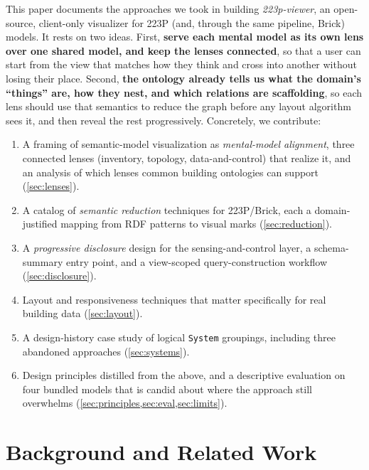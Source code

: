\documentclass[10pt,twocolumn]{article}
\newcommand{\pred}[1]{\texttt{#1}}   %
\begin{document}
This paper documents the approaches we took in building \emph{223p-viewer}, an
open-source, client-only visualizer for 223P (and, through the same pipeline,
Brick) models. It rests on two ideas. First, \textbf{serve each mental model as
its own lens over one shared model, and keep the lenses connected}, so that a user
can start from the view that matches how they think and cross into another
without losing their place. Second, \textbf{the ontology already tells us what the
domain's ``things'' are, how they nest, and which relations are scaffolding}, so
each lens should use that semantics to reduce the graph before any layout
algorithm sees it, and then reveal the rest progressively.
Concretely, we contribute:

\begin{enumerate}[leftmargin=*,itemsep=1pt]
  \item A framing of semantic-model visualization as \emph{mental-model
  alignment}, three connected lenses (inventory, topology, data-and-control)
  that realize it, and an analysis of which lenses common building ontologies
  can support (\cref{sec:lenses}).
  \item A catalog of \emph{semantic reduction} techniques for 223P/Brick, each a
  domain-justified mapping from RDF patterns to visual marks
  (\cref{sec:reduction}).
  \item A \emph{progressive disclosure} design for the sensing-and-control layer,
  a schema-summary entry point, and a view-scoped query-construction workflow
  (\cref{sec:disclosure}).
  \item Layout and responsiveness techniques that matter specifically for
  real building data (\cref{sec:layout}).
  \item A design-history case study of logical \pred{System} groupings,
  including three abandoned approaches (\cref{sec:systems}).
  \item Design principles distilled from the above, and a descriptive
  evaluation on four bundled models that is candid about where the approach
  still overwhelms (\cref{sec:principles,sec:eval,sec:limits}).
\end{enumerate}

\section{Background and Related Work}
\label{sec:related}
\end{document}
